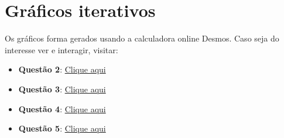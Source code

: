 \documentclass[10pt, a4paper]{article}
\begin{document}
\appendix

\appendixname

\section{Gráficos iterativos}

Os gráficos forma gerados usando a calculadora online Desmos. Caso seja do interesse ver e interagir, visitar:

\begin{itemize}
  \item \textbf{Questão 2}: \href{https://www.desmos.com/calculator/nu2funszid}{Clique aqui}
  \item \textbf{Questão 3}: \href{https://www.desmos.com/calculator/weifmlruuk}{Clique aqui}
  \item \textbf{Questão 4}: \href{https://www.desmos.com/calculator/a0nfpi3fnx}{Clique aqui}
  \item \textbf{Questão 5}: \href{https://www.desmos.com/calculator/q8xrue3lws}{Clique aqui}
\end{itemize}




\end{document}
